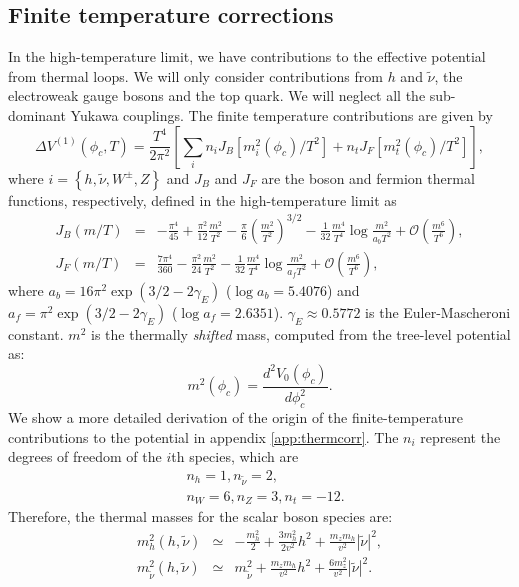 \subsection{Finite temperature corrections}
In the high-temperature limit, we have contributions to the effective potential from thermal loops. We will only consider contributions from $h$ and $\tilde{\nu}$, the electroweak gauge bosons and the top quark. We will neglect all the sub-dominant Yukawa couplings. The finite temperature contributions are given by
\begin{equation}
\Delta V^{(1)}(\phi_c,T)=\frac{T^4}{2\pi^2} \left[ \sum_{i} n_i J_B [m^2_i (\phi_c)/T^2] + n_t J_F [m^2_t (\phi_c)/T^2] \right],
\end{equation}
where $i=\left\{h,\tilde{\nu},W^{\pm},Z\right\}$ and $J_B$ and $J_F$ are the boson and fermion thermal functions, respectively, defined in the high-temperature limit as
\begin{eqnarray}
J_B(m/T)&=&-\frac{\pi^4}{45}+\frac{\pi^2}{12}\frac{m^2}{T^2}-\frac{\pi}{6}\left(\frac{m^2}{T^2} \right)^{3/2}-\frac{1}{32}\frac{m^4}{T^4}\log \frac{m^2}{a_b T^2}+\mathcal{O}\left( \frac{m^6}{T^6}\right), \\
J_F(m/T)&=&\frac{7\pi^4}{360}-\frac{\pi^2}{24}\frac{m^2}{T^2}-\frac{1}{32}\frac{m^4}{T^4}\log \frac{m^2}{a_f T^2}+\mathcal{O}\left( \frac{m^6}{T^6}\right),
\end{eqnarray}
where $a_b=16\pi^2 \exp (3/2-2\gamma_E)$ ($\log a_b = 5.4076$) and $a_f=\pi^2 \exp (3/2-2\gamma_E)$ ($\log a_f = 2.6351$). $\gamma_E \approx 0.5772$ is the Euler-Mascheroni constant. $m^2$ is the thermally \textit{shifted} mass, computed from the tree-level potential as:
\begin{equation}
m^2 (\phi_c) = \frac{d^2 V_0 (\phi_c)}{d\phi^2_c}.
\end{equation}
We show a more detailed derivation of the origin of the finite-temperature contributions to the potential in appendix \ref{app:thermcorr}. The $n_i$ represent the degrees of freedom of the $i$th species, which are
\begin{align}
&n_h=1, n_{\tilde{\nu}}=2, \\
&n_W=6, n_Z=3, n_t=-12.
\end{align}
Therefore, the thermal masses for the scalar boson species are:
\begin{eqnarray}
m^2_{h}(h,\tilde{\nu})& \simeq & -\frac{m^2_h}{2}+\frac{3m^2_h}{2v^2}h^2+\frac{m_z m_h}{v^2}|\tilde{\nu}|^2, \\
m^2_{\tilde{\nu}}(h,\tilde{\nu})& \simeq & m^2_{\tilde{\nu}}+\frac{m_z m_h}{v^2}h^2+\frac{6m^2_z}{v^2}|\tilde{\nu}|^2.
\end{eqnarray}
